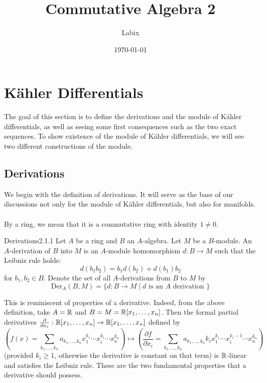 \documentclass[a4paper]{article}
\title{Commutative Algebra 2}
\author{Labix}
\date{\today}
\begin{document}
\maketitle
\begin{abstract}
\end{abstract}
\pagebreak
\tableofcontents
\pagebreak

\section{Kähler Differentials}
The goal of this section is to define the derivations and the module of Kähler differentials, as well as seeing some first consequences such as the two exact sequences. To show existence of the module of Kähler differentials, we will see two different constructions of the module. 

\subsection{Derivations}
We begin with the definition of derivations. It will serve as the base of our discussions not only for the module of Kähler differentials, but also for manifolds. \\~\\

By a ring, we mean that it is a commutative ring with identity $1\neq 0$. 

\begin{defn}{Derivations}{2.1.1} Let $A$ be a ring and $B$ an $A$-algebra. Let $M$ be a $B$-module. An $A$-derivation of $B$ into $M$ is an $A$-module homomorphism $d:B\to M$ such that the Leibniz rule holds: $$d(b_1b_2)=b_1d(b_2)+d(b_1)b_2$$ for $b_1,b_2\in B$. Denote the set of all $A$-derivations from $B$ to $M$ by $$\text{Der}_A(B,M)=\{d:B\to M\;|\;d\text{ is an }A\text{ derivation }\}$$
\end{defn}

This is reminiscent of properties of a derivative. Indeed, from the above definition, take $A=\mathbb{R}$ and $B=M=\mathbb{R}[x_1,\dots,x_n]$. Then the formal partial derivatives $\frac{\partial}{\partial x_i}:\mathbb{R}[x_1,\dots,x_n]\to\mathbb{R}[x_1,\dots,x_n]$ defined by $$\left(f(x)=\sum_{k_1,\dots,k_n}a_{k_1,\dots,k_n}x_1^{k_1}\cdots x_i^{k_i}\cdots x_n^{k_n}\right)\mapsto\left(\frac{\partial f}{\partial x_i}=\sum_{k_1,\dots,k_n}a_{k_1,\dots,k_n}k_ix_1^{k_1}\cdots x_i^{k_i-1}\cdots x_n^{k_n}\right)$$ (provided $k_i\geq 1$, otherwise the derivative is constant on that term) is $\mathbb{R}$-linear and satisfies the Leibniz rule. These are the two fundamental properties that a derivative should possess. \\~\\
\end{document}
